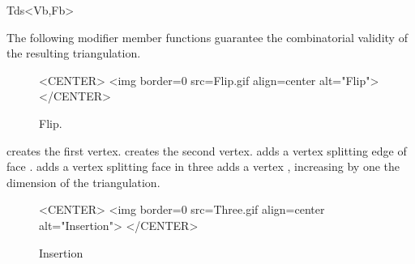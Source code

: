 \begin{ccClassTemplate}{Tds<Vb,Fb>}
\ccGlue
{}


The following modifier member functions  guarantee
the combinatorial validity of the resulting triangulation.



\begin{figure}
\begin{ccTexOnly}
\begin{center} %

\end{center}
\end{ccTexOnly} 
\caption{Flip.
\label{I1_fig_flip_bis}}

\begin{ccHtmlOnly}
<CENTER>
<img border=0 src=Flip.gif align=center alt="Flip">
</CENTER>
\end{ccHtmlOnly} 
\end{figure}


 {creates the first 
vertex.}
\ccGlue
{} {creates the second 
vertex.}
 {adds a
vertex  splitting 
edge  of face .}
\ccGlue
{} {adds a vertex
 splitting  face
 in three }
\ccGlue
{} {adds
a vertex , increasing by one the dimension of the triangulation.
}

\begin{figure}
\begin{ccTexOnly}
\begin{center}  \end{center}
\caption{Insertion}
\end{ccTexOnly} 

\begin{ccHtmlOnly}
<CENTER>
<img border=0 src=Three.gif align=center alt="Insertion">
</CENTER>
\end{ccHtmlOnly} 
\end{figure}



\end{ccClassTemplate}
